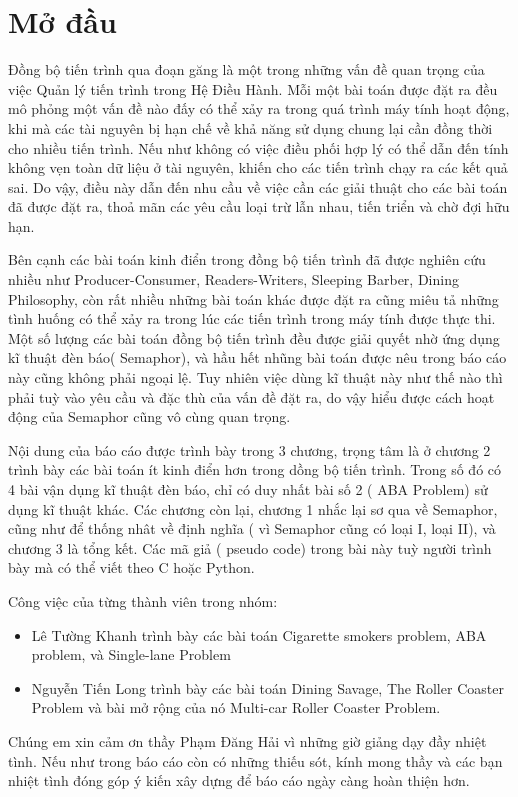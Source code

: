 \chapter*{Mở đầu}
Đồng bộ tiến trình qua đoạn găng là một trong những vấn đề quan trọng của việc Quản lý tiến trình trong Hệ Điều Hành. Mỗi một bài toán được đặt ra đều mô phỏng một vấn đề nào đấy có thể xảy ra trong quá trình máy tính hoạt động, khi mà các tài nguyên bị hạn chế về khả năng sử dụng chung lại cần đồng thời cho nhiều tiến trình. Nếu như không có việc điều phối hợp lý có thể dẫn đến tính không vẹn toàn dữ liệu ở tài nguyên, khiến cho các tiến trình chạy ra các kết quả sai. Do vậy, điều này dẫn đến nhu cầu về việc cần các giải thuật cho các bài toán đã được đặt ra, thoả mãn các yêu cầu loại trừ lẫn nhau, tiến triển và chờ đợi hữu hạn. 

Bên cạnh các bài toán kinh điển trong đồng bộ tiến trình đã được nghiên cứu nhiều như Producer-Consumer, Readers-Writers, Sleeping Barber, Dining Philosophy, còn rất nhiều những bài toán khác được đặt ra cũng miêu tả những tình huống có thể xảy ra trong lúc các tiến trình trong máy tính được thực thi. Một số lượng các bài toán đồng bộ tiến trình đều được giải quyết nhờ ứng dụng kĩ thuật đèn báo( Semaphor), và hầu hết nhũng bài toán được nêu trong báo cáo này cũng không phải ngoại lệ. Tuy nhiên việc dùng kĩ thuật này như thế nào thì phải tuỳ vào yêu cầu và đặc thù của vấn đề đặt ra, do vậy hiểu được cách hoạt động của Semaphor cũng vô cùng quan trọng.

Nội dung của báo cáo được trình bày trong 3 chương, trọng tâm là ở chương 2 trình bày các bài toán ít kinh điển hơn trong dồng bộ tiến trình. Trong số đó có 4 bài vận dụng kĩ thuật đèn báo, chỉ có duy nhất bài số 2 ( ABA Problem) sử dụng kĩ thuật khác. Các chương còn lại, chương 1 nhắc lại sơ qua về Semaphor, cũng như để thống nhât về định nghĩa ( vì Semaphor cũng có loại I, loại II), và chương 3 là tổng kết. Các mã giả ( pseudo code) trong bài này tuỳ người trình bày mà có thể viết theo C hoặc Python.

Công việc của từng thành viên trong nhóm:
\begin{itemize}
	\item Lê Tường Khanh trình bày các bài toán Cigarette smokers problem, ABA problem, và Single-lane Problem
	\item Nguyễn Tiến Long trình bày các bài toán Dining Savage, The Roller Coaster Problem và bài mở rộng của nó Multi-car Roller Coaster Problem.
\end{itemize}

Chúng em xin cảm ơn thầy Phạm Đăng Hải vì những giờ giảng dạy đầy nhiệt tình.  Nếu như trong báo cáo còn có những thiếu sót, kính mong thầy và các bạn nhiệt tình đóng góp ý kiến xây dựng để báo cáo ngày càng hoàn thiện hơn.
